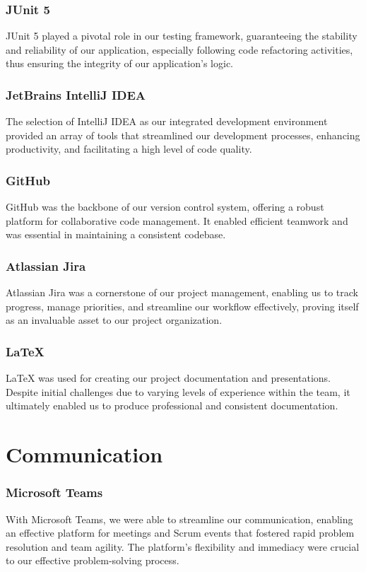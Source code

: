 \subsubsection{JUnit 5}
JUnit 5 played a pivotal role in our testing framework, guaranteeing the stability and reliability of our application, especially following code refactoring activities, thus ensuring the integrity of our application's logic.

\subsubsection{JetBrains IntelliJ IDEA}
The selection of IntelliJ IDEA as our integrated development environment provided an array of tools that streamlined our development processes, enhancing productivity, and facilitating a high level of code quality.

\subsubsection{GitHub}
GitHub was the backbone of our version control system, offering a robust platform for collaborative code management.
It enabled efficient teamwork and was essential in maintaining a consistent codebase.

\subsubsection{Atlassian Jira}
Atlassian Jira was a cornerstone of our project management, enabling us to track progress, manage priorities, and streamline our workflow effectively, proving itself as an invaluable asset to our project organization.

\subsubsection{LaTeX}
LaTeX was used for creating our project documentation and presentations.
Despite initial challenges due to varying levels of experience within the team, it ultimately enabled us to produce professional and consistent documentation.


\section{Communication}

\subsubsection{Microsoft Teams}
With Microsoft Teams, we were able to streamline our communication, enabling an effective platform for meetings and Scrum events that fostered rapid problem resolution and team agility.
The platform's flexibility and immediacy were crucial to our effective problem-solving process.

